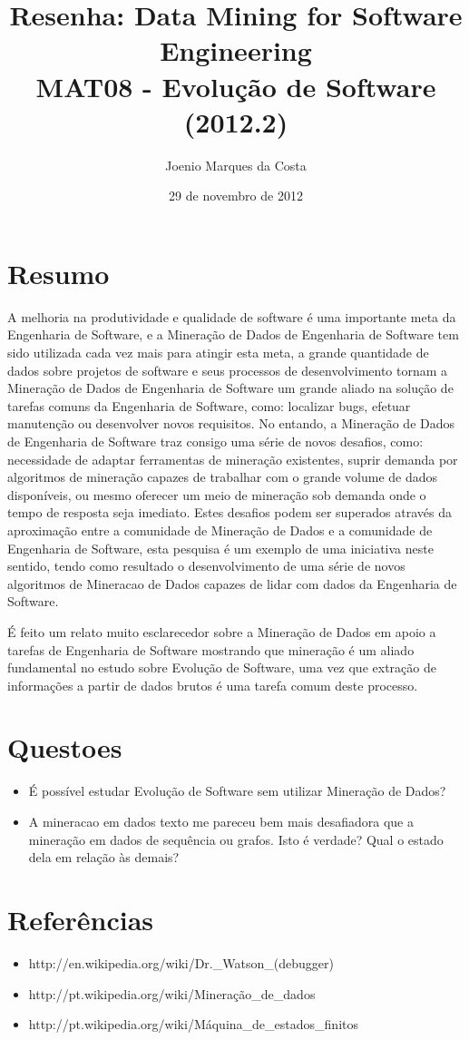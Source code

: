 \documentclass[12pt]{article}
\title{Resenha: Data Mining for Software Engineering \cite{DataMiningfo} \\
 \large MAT08 - Evolução de Software (2012.2)}
\author{Joenio Marques da Costa}
\date{29 de novembro de 2012}
\begin{document}
\maketitle

\section{Resumo}


A melhoria na produtividade e qualidade de software é uma importante meta da
Engenharia de Software, e a Mineração de Dados de Engenharia de Software tem
sido utilizada cada vez mais para atingir esta meta, a grande quantidade de
dados sobre projetos de software e seus processos de desenvolvimento tornam a
Mineração de Dados de Engenharia de Software um grande aliado na solução de
tarefas comuns da Engenharia de Software, como: localizar bugs, efetuar
manutenção ou desenvolver novos requisitos. No entando, a Mineração de Dados de
Engenharia de Software traz consigo uma série de novos desafios, como:
necessidade de adaptar ferramentas de mineração existentes, suprir demanda por
algoritmos de mineração capazes de trabalhar com o grande volume de dados
disponíveis, ou mesmo oferecer um meio de mineração sob demanda onde o tempo de
resposta seja imediato. Estes desafios podem ser superados através da
aproximação entre a comunidade de Mineração de Dados e a comunidade de
Engenharia de Software, esta pesquisa é um exemplo de uma iniciativa neste
sentido, tendo como resultado o desenvolvimento de uma série de novos
algoritmos de Mineracao de Dados capazes de lidar com dados da Engenharia de
Software.

É feito um relato muito esclarecedor sobre a Mineração de Dados em apoio a
tarefas de Engenharia de Software mostrando que mineração é um aliado
fundamental no estudo sobre Evolução de Software, uma vez que extração de
informações a partir de dados brutos é uma tarefa comum deste processo.

\section{Questoes}

\begin{itemize}
  \item É possível estudar Evolução de Software sem utilizar Mineração de
     Dados?
  \item A mineracao em dados texto me pareceu bem mais desafiadora que a
     mineração em dados de sequência ou grafos. Isto é verdade? Qual o estado
     dela em relação às demais?
\end{itemize}

\section{Referências}

\begin{itemize}
  \item http://en.wikipedia.org/wiki/Dr.\_Watson\_(debugger)
  \item http://pt.wikipedia.org/wiki/Mineração\_de\_dados
  \item http://pt.wikipedia.org/wiki/Máquina\_de\_estados\_finitos
\end{itemize}


\end{document}
